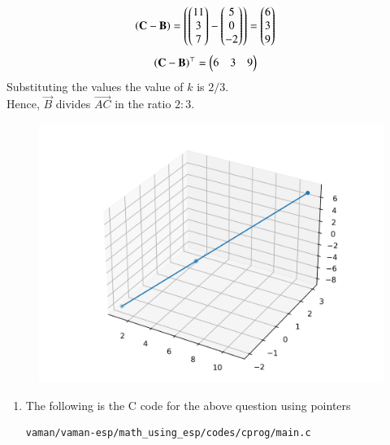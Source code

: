 \begin{enumerate}[label=\thesection.\arabic*.,ref=\thesection.\theenumi]
			\begin{align}
				\left(\mathbf{C-B}\right) &=
				\left(\begin{pmatrix}11\\3\\7\end{pmatrix}-\begin{pmatrix}5\\0\\-2\end{pmatrix}\right) =
				\begin{pmatrix}6\\3\\9\end{pmatrix}
			\end{align}
			\begin{align*}
				\left(\mathbf{C}-\mathbf{B}\right)^{\top} &=
				\begin{pmatrix}6 & 3 & 9\end{pmatrix}
			\end{align*}
			Substituting the values the value of $k$ is $2/3$.
			\\    Hence, $\vec{B}$ divides $\vec{AC}$ in the ratio $2:3$.
	\begin{figure}[!h]
		\begin{center}
			\includegraphics[width=\columnwidth]{./math_using_esp/figs/line_3d.png}
		\end{center}
		\caption{}
		\label{fig:Fig1}
	\end{figure}
\end{enumerate}

\begin{enumerate}[label=\thesection.\arabic*.,ref=\thesection.\theenumi]	
\subsection{C pointer code}
\item The following is the C code for the above question using pointers
\begin{lstlisting}
vaman/vaman-esp/math_using_esp/codes/cprog/main.c
\end{lstlisting}
\end{enumerate}

